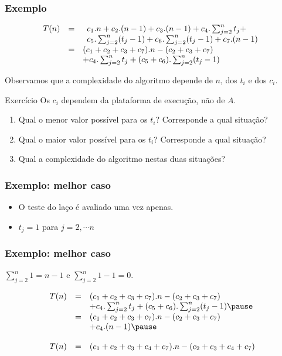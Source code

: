 \documentclass[handout]{beamer}
\begin{document}
\begin{frame}
  \frametitle{Exemplo}

  $$
  \begin{array}{rcl}
    T(n) & = & \begin{array}[t]{l}
      c_1.n+c_2.(n-1)+c_3.(n-1)+c_4.\sum_{j=2}^{n} t_j + \\
      c_5.\sum_{j=2}^{n} (t_j-1) + c_6.\sum_{j=2}^{n} (t_j-1)+c_7.(n-1) \\
      \end{array} \\
    & = & (c_1+c_2+c_3+c_7).n  - (c_2 + c_3 + c_7) \\
    & & + c_4.\sum_{j=2}^{n} t_j+ (c_5+c_6).\sum_{j=2}^{n} (t_j-1)
  \end{array}
  $$

  Observamos que a complexidade do algoritmo depende de $n$, dos $t_i$ e dos
  $c_i$.
  \pause
  \begin{block}{Exercício}
    Os $c_i$ dependem da plataforma de execução, não de $A$.
    \begin{enumerate}
    \item Qual o menor valor possível para os $t_i$? Corresponde a qual situação?
    \item Qual o maior valor possível para os $t_i$? Corresponde a qual situação?
    \item Qual a complexidade do algoritmo nestas duas situações?
    \end{enumerate}
  \end{block}

\end{frame}

\begin{frame}

\frametitle{Exemplo: melhor caso}

  

  \begin{itemize}
    \item O teste do laço é avaliado uma vez apenas.
    \item $t_j = 1$ para $j = 2, \cdots n$
  \end{itemize}

\end{frame}

\begin{frame}

\frametitle{Exemplo: melhor caso}

$\sum_{j=2}^{n} 1 = n-1$ e $\sum_{j=2}^{n} 1 - 1 = 0$.

  $$
  \begin{array}{rcl}
    T(n) & = & (c_1+c_2+c_3+c_7).n  - (c_2 + c_3 + c_7) \\
    & & + c_4.\sum_{j=2}^{n} t_j+ (c_5+c_6).\sum_{j=2}^{n} (t_j-1) \pause \\
    & = & (c_1+c_2+c_3+c_7).n - (c_2 + c_3 +c_7) \\
    & & + c_4.(n-1) \pause \\
    \\
    T(n) & = & (c_1+c_2+c_3+c_4+c_7).n - (c_2 + c_3 + c_4 + c_7)
  \end{array}
  $$

\end{frame}
\end{document}
